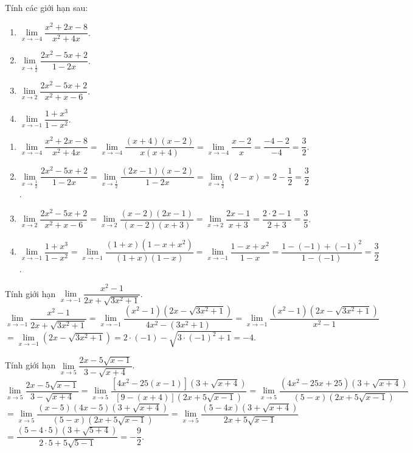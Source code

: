 \begin{vd}%
Tính các giới hạn sau:
\begin{multicols}{2}
\begin{enumerate}
\item $\lim\limits_{x\to -4}\dfrac{x^2+2x-8}{x^2+4x}$.
\item $\lim\limits_{x\to \frac{1}{2}}\dfrac{2x^2-5x+2}{1-2x}$.
\item $\lim\limits_{x\to 2}\dfrac{2x^2-5x+2}{x^2+x-6}$.
\item $\lim\limits_{x\to -1}\dfrac{1+x^3}{1-x^2}$.
\end{enumerate}
\end{multicols}
\loigiai
{
\begin{enumerate}
\item $\lim\limits_{x\to -4}\dfrac{x^2+2x-8}{x^2+4x} = \lim\limits_{x\to -4}\dfrac{(x+4)(x-2)}{x(x+4)} = \lim\limits_{x\to -4}\dfrac{x-2}{x} = \dfrac{-4-2}{-4} = \dfrac{3}{2}$.
\item $\lim\limits_{x\to \frac{1}{2}}\dfrac{2x^2-5x+2}{1-2x} = \lim\limits_{x\to \frac{1}{2}}\dfrac{(2x-1)(x-2)}{1-2x} = \lim\limits_{x\to \frac{1}{2}}(2-x)= 2 - \dfrac{1}{2} = \dfrac{3}{2}$.
\item $\lim\limits_{x\to 2}\dfrac{2x^2-5x+2}{x^2+x-6} = \lim\limits_{x\to 2}\dfrac{(x-2)(2x-1)}{(x-2)(x+3)} = \lim\limits_{x\to 2}\dfrac{2x-1}{x+3} = \dfrac{2 \cdot 2-1}{2+3} = \dfrac{3}{5}$.
\item $\lim\limits_{x\to -1}\dfrac{1+x^3}{1-x^2} = \lim\limits_{x\to -1}\dfrac{(1+x)(1-x+x^2)}{(1+x)(1-x)} = \lim\limits_{x\to -1}\dfrac{1-x+x^2}{1-x} = \dfrac{1-(-1)+(-1)^2}{1-(-1)} = \dfrac{3}{2}$.
\end{enumerate}
}
\end{vd}


\begin{vd}%
Tính giới hạn $\lim\limits_{x\to -1}\dfrac{x^2-1}{2x+\sqrt{3x^2+1}}$.
\loigiai
{
$\lim\limits_{x\to -1}\dfrac{x^2-1}{2x+\sqrt{3x^2+1}} = \lim\limits_{x\to -1}\dfrac{(x^2-1)\left(2x-\sqrt{3x^2+1}\right)}{4x^2-(3x^2+1)} = \lim\limits_{x\to -1}\dfrac{(x^2-1)\left(2x-\sqrt{3x^2+1}\right)}{x^2-1}$\\
$= \lim\limits_{x\to -1}\left(2x-\sqrt{3x^2+1}\right) = 2 \cdot (-1)-\sqrt{3 \cdot (-1)^2+1} = -4$.
}
\end{vd}


\begin{vd}%
Tính giới hạn $\lim\limits_{x\to 5}\dfrac{2x-5\sqrt{x-1}}{3-\sqrt{x+4}}$.
\loigiai
{
$\lim\limits_{x\to 5}\dfrac{2x-5\sqrt{x-1}}{3-\sqrt{x+4}} = \lim\limits_{x\to 5}\dfrac{\left[4x^2-25(x-1)\right]\left(3+\sqrt{x+4}\right)}{\left[9-(x+4)\right]\left(2x+5\sqrt{x-1}\right)} = \lim\limits_{x\to 5}\dfrac{(4x^2-25x+25)\left(3+\sqrt{x+4}\right)}{(5-x)\left(2x+5\sqrt{x-1}\right)}$\\
$= \lim\limits_{x\to 5}\dfrac{(x-5)(4x-5)\left(3+\sqrt{x+4}\right)}{(5-x)\left(2x+5\sqrt{x-1}\right)} = \lim\limits_{x\to 5}\dfrac{(5-4x)\left(3+\sqrt{x+4}\right)}{2x+5\sqrt{x-1}}$\\
$= \dfrac{(5-4 \cdot 5)(3+\sqrt{5+4})}{2 \cdot 5+5\sqrt{5-1}} = -\dfrac{9}{2}$.
}
\end{vd}


